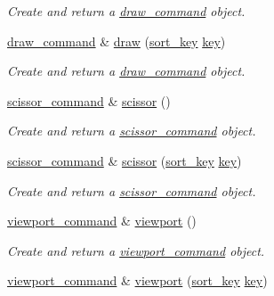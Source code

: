 \begin{DoxyCompactItemize}
\begin{DoxyCompactList}\small\item\em Create and return a \mbox{\hyperlink{classmoka_1_1draw__command}{draw\+\_\+command}} object. \end{DoxyCompactList}\item 
\mbox{\hyperlink{classmoka_1_1draw__command}{draw\+\_\+command}} \& \mbox{\hyperlink{classmoka_1_1command__list_a245f4b8db48ec2f5e511778e61e1b4bf}{draw}} (\mbox{\hyperlink{namespacemoka_afa30a616e67b83113ebdb857555cf2bb}{sort\+\_\+key}} \mbox{\hyperlink{namespacemoka_a45a36b05a9b9eddb028d6c60305ae71d}{key}})
\begin{DoxyCompactList}\small\item\em Create and return a \mbox{\hyperlink{classmoka_1_1draw__command}{draw\+\_\+command}} object. \end{DoxyCompactList}\item 
\mbox{\hyperlink{classmoka_1_1scissor__command}{scissor\+\_\+command}} \& \mbox{\hyperlink{classmoka_1_1command__list_a4e11fd1ef7dfb253e66e62ef88009059}{scissor}} ()
\begin{DoxyCompactList}\small\item\em Create and return a \mbox{\hyperlink{classmoka_1_1scissor__command}{scissor\+\_\+command}} object. \end{DoxyCompactList}\item 
\mbox{\hyperlink{classmoka_1_1scissor__command}{scissor\+\_\+command}} \& \mbox{\hyperlink{classmoka_1_1command__list_a3c8dfb8a30395d9256fc1b84b471aba3}{scissor}} (\mbox{\hyperlink{namespacemoka_afa30a616e67b83113ebdb857555cf2bb}{sort\+\_\+key}} \mbox{\hyperlink{namespacemoka_a45a36b05a9b9eddb028d6c60305ae71d}{key}})
\begin{DoxyCompactList}\small\item\em Create and return a \mbox{\hyperlink{classmoka_1_1scissor__command}{scissor\+\_\+command}} object. \end{DoxyCompactList}\item 
\mbox{\hyperlink{classmoka_1_1viewport__command}{viewport\+\_\+command}} \& \mbox{\hyperlink{classmoka_1_1command__list_a93d0d14be17e169aeb72ba2eeb3512ba}{viewport}} ()
\begin{DoxyCompactList}\small\item\em Create and return a \mbox{\hyperlink{classmoka_1_1viewport__command}{viewport\+\_\+command}} object. \end{DoxyCompactList}\item 
\mbox{\hyperlink{classmoka_1_1viewport__command}{viewport\+\_\+command}} \& \mbox{\hyperlink{classmoka_1_1command__list_aa3f9a1b7e3cede9efc46ccb300fee586}{viewport}} (\mbox{\hyperlink{namespacemoka_afa30a616e67b83113ebdb857555cf2bb}{sort\+\_\+key}} \mbox{\hyperlink{namespacemoka_a45a36b05a9b9eddb028d6c60305ae71d}{key}})

\end{DoxyCompactItemize}
